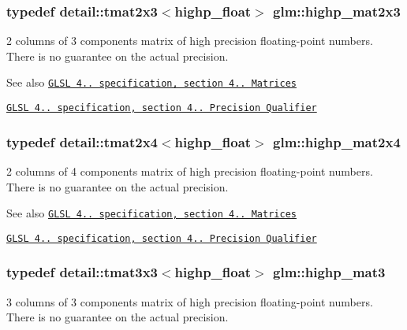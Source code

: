 \subsubsection[{highp\+\_\+mat2x3}]{\setlength{\rightskip}{0pt plus 5cm}typedef detail\+::tmat2x3$<$highp\+\_\+float$>$ {\bf glm\+::highp\+\_\+mat2x3}}\label{group__core__precision_ga89136b699656886b0941c95cf2778da3}
2 columns of 3 components matrix of high precision floating-\/point numbers. There is no guarantee on the actual precision.

\begin{DoxySeeAlso}{See also}
\href{http://www.opengl.org/registry/doc/GLSLangSpec.4.20.8.pdf}{\tt G\+L\+S\+L 4.. specification, section 4.. Matrices} 

\href{http://www.opengl.org/registry/doc/GLSLangSpec.4.20.8.pdf}{\tt G\+L\+S\+L 4.. specification, section 4.. Precision Qualifier} 
\end{DoxySeeAlso}
\hypertarget{group__core__precision_ga41deb7c45e9219ccccdc011aafd42f27}{}
\subsubsection[{highp\+\_\+mat2x4}]{\setlength{\rightskip}{0pt plus 5cm}typedef detail\+::tmat2x4$<$highp\+\_\+float$>$ {\bf glm\+::highp\+\_\+mat2x4}}\label{group__core__precision_ga41deb7c45e9219ccccdc011aafd42f27}
2 columns of 4 components matrix of high precision floating-\/point numbers. There is no guarantee on the actual precision.

\begin{DoxySeeAlso}{See also}
\href{http://www.opengl.org/registry/doc/GLSLangSpec.4.20.8.pdf}{\tt G\+L\+S\+L 4.. specification, section 4.. Matrices} 

\href{http://www.opengl.org/registry/doc/GLSLangSpec.4.20.8.pdf}{\tt G\+L\+S\+L 4.. specification, section 4.. Precision Qualifier} 
\end{DoxySeeAlso}
\hypertarget{group__core__precision_ga28f20673ba4b1515f27a42a60900a75d}{}
\subsubsection[{highp\+\_\+mat3}]{\setlength{\rightskip}{0pt plus 5cm}typedef detail\+::tmat3x3$<$highp\+\_\+float$>$ {\bf glm\+::highp\+\_\+mat3}}\label{group__core__precision_ga28f20673ba4b1515f27a42a60900a75d}
3 columns of 3 components matrix of high precision floating-\/point numbers. There is no guarantee on the actual precision.

